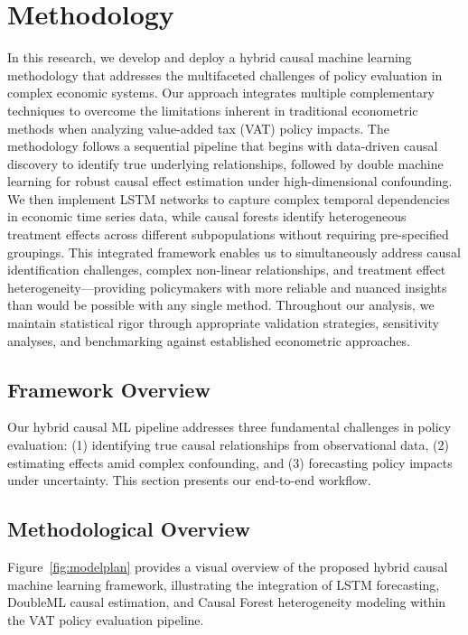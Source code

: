 \section{Methodology}\label{sec:methods}

In this research, we develop and deploy a hybrid causal machine learning methodology that addresses the multifaceted challenges of policy evaluation in complex economic systems. Our approach integrates multiple complementary techniques to overcome the limitations inherent in traditional econometric methods when analyzing value-added tax (VAT) policy impacts. The methodology follows a sequential pipeline that begins with data-driven causal discovery to identify true underlying relationships, followed by double machine learning for robust causal effect estimation under high-dimensional confounding. We then implement LSTM networks to capture complex temporal dependencies in economic time series data, while causal forests identify heterogeneous treatment effects across different subpopulations without requiring pre-specified groupings. This integrated framework enables us to simultaneously address causal identification challenges, complex non-linear relationships, and treatment effect heterogeneity—providing policymakers with more reliable and nuanced insights than would be possible with any single method. Throughout our analysis, we maintain statistical rigor through appropriate validation strategies, sensitivity analyses, and benchmarking against established econometric approaches.

\subsection{Framework Overview}\label{subsec:framework}

Our hybrid causal ML pipeline addresses three fundamental challenges in policy evaluation: (1) identifying true causal relationships from observational data, (2) estimating effects amid complex confounding, and (3) forecasting policy impacts under uncertainty. This section presents our end-to-end workflow.

\subsection{Methodological Overview}\label{subsec:methodology_overview}

Figure~\ref{fig:modelplan} provides a visual overview of the proposed hybrid causal machine learning framework, illustrating the integration of LSTM forecasting, DoubleML causal estimation, and Causal Forest heterogeneity modeling within the VAT policy evaluation pipeline.

